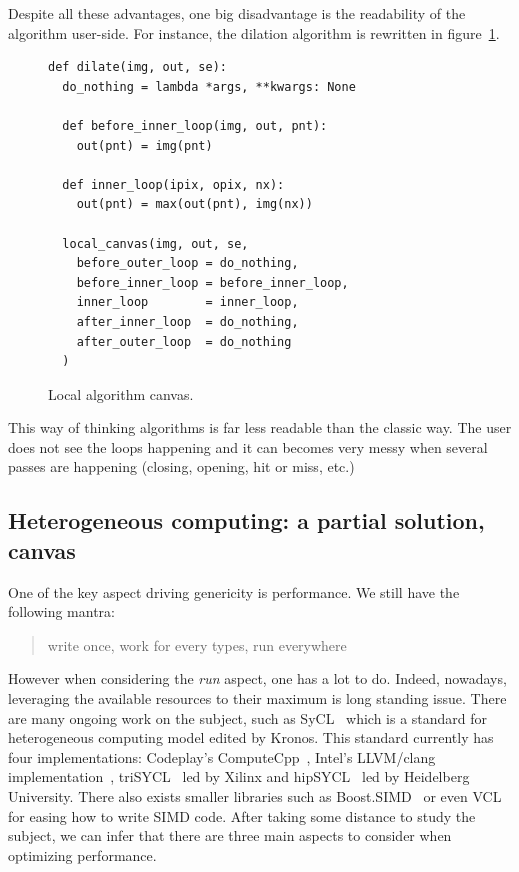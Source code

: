 Despite all these advantages, one big disadvantage is the readability of the algorithm user-side. For instance, the
dilation algorithm is rewritten in figure~\ref{code:local.algorithm.dilate}.

\begin{figure}[htbp]
  \centering
  \begin{verbatim}
def dilate(img, out, se):
  do_nothing = lambda *args, **kwargs: None

  def before_inner_loop(img, out, pnt):
    out(pnt) = img(pnt)
  
  def inner_loop(ipix, opix, nx):
    out(pnt) = max(out(pnt), img(nx))

  local_canvas(img, out, se,
    before_outer_loop = do_nothing,
    before_inner_loop = before_inner_loop,
    inner_loop        = inner_loop,
    after_inner_loop  = do_nothing,
    after_outer_loop  = do_nothing
  )
  \end{verbatim}

  \caption{Local algorithm canvas.}
  \label{code:local.algorithm.dilate}
\end{figure}

This way of thinking algorithms is far less readable than the classic way. The user does not see the loops happening and
it can becomes very messy when several passes are happening (closing, opening, hit or miss, etc.)



\subsection{Heterogeneous computing: a partial solution, canvas}
\label{subsec:heterogeneous}

One of the key aspect driving genericity is performance. We still have the following mantra: \blockquote{write once,
  work for every types, run everywhere}. However when considering the \emph{run} aspect, one has a lot to do. Indeed,
nowadays, leveraging the available resources to their maximum is long standing issue. There are many ongoing work on
the subject, such as SyCL~\cite{brown.2019.heterogeneous,wong.2019.heterogeneous} which is a standard for
heterogeneous computing model edited by Kronos. This standard currently has four implementations: Codeplay's
ComputeCpp~\parencite{codeplay.2021.computecpp}, Intel’s LLVM/clang implementation~\parencite{intel-llvm.2021.sycl},
triSYCL~\parencite{xilinx.2021.triSYCL} led by Xilinx and hipSYCL~\parencite{aksel.2020.hipsycl} led by Heidelberg
University. There also exists smaller libraries such as Boost.SIMD~\cite{esterie.2014.boostsimd} or even
VCL~\cite{fog.2013.vcl} for easing how to write SIMD code. After taking some distance to study the subject, we can
infer that there are three main aspects to consider when optimizing performance.

